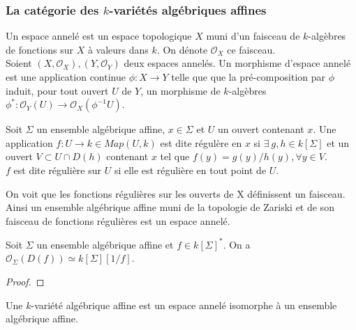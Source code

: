 \subsubsection{La catégorie des $k$-variétés algébriques affines}
\begin{defn}\label{espaceannele}
Un espace annelé est un espace topologique $X$ muni d'un faisceau de $k$-algèbres de fonctions sur $X$ à valeurs dans $k$. On dénote $\mathcal{O}_X$ ce faisceau.\\
Soient $(X, \mathcal{O}_X), (Y, \mathcal{O}_Y)$ deux espaces annelés. Un morphisme d'espace annelé est une application continue $\phi: X\rightarrow Y$ telle que que la pré-composition par $\phi$ induit, pour tout ouvert $U$ de $Y$, un morphisme de $k$-algèbres $\phi^*:\mathcal{O}_Y(U) \rightarrow \mathcal{O}_X(\phi^{-1}U)$.
\end{defn}

\begin{defn}
Soit $\Sigma$ un ensemble algébrique affine, $x\in \Sigma$ et $U$ un ouvert contenant $x$. Une application $f:U\rightarrow k\in Map(U,k)$ est dite régulère en $x$ si $\exists\ g,h\in k[\Sigma]$ et un ouvert $V\subset U\cap D(h)$ contenant $x$ tel que $f(y) = g(y)/h(y), \forall y\in V$.\\
$f$ est dite régulière sur $U$ si elle est régulière en tout point de $U$.
\end{defn}

On voit que les fonctions régulières sur les ouverts de X définissent un faisceau. Ainsi un ensemble algébrique affine muni de la topologie de Zariski et de son faisceau de fonctions régulières est un espace annelé. 

\begin{prop}
Soit $\Sigma$ un ensemble algébrique affine et $f\in k[\Sigma]^*$. On a $\mathcal{O}_\Sigma(D(f))\simeq k[\Sigma][1/f]$.
\end{prop}
\begin{proof}

\end{proof}

\begin{defn}
Une $k$-variété algébrique affine est un espace annelé isomorphe à un ensemble algébrique affine.
\end{defn}


